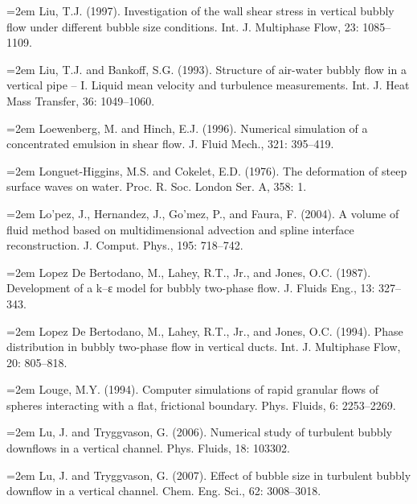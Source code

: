 \documentclass[11pt,a4paper,openany,fontset=none]{ctexbook}
\begin{document}
\par\hangindent=2em Liu, T.J. (1997). Investigation of the wall shear stress in vertical bubbly flow under different bubble size conditions. Int. J. Multiphase Flow, 23: 1085--1109.

\par\hangindent=2em Liu, T.J. and Bankoff, S.G. (1993). Structure of air-water bubbly flow in a vertical pipe -- I. Liquid mean velocity and turbulence measurements. Int. J. Heat Mass Transfer, 36: 1049--1060.

\par\hangindent=2em Loewenberg, M. and Hinch, E.J. (1996). Numerical simulation of a concentrated emulsion in shear flow. J. Fluid Mech., 321: 395--419.

\par\hangindent=2em Longuet-Higgins, M.S. and Cokelet, E.D. (1976). The deformation of steep surface waves on water. Proc. R. Soc. London Ser. A, 358: 1.

\par\hangindent=2em Lo'pez, J., Hernandez, J., Go'mez, P., and Faura, F. (2004). A volume of fluid method based on multidimensional advection and spline interface reconstruction. J. Comput. Phys., 195: 718--742.


\par\hangindent=2em Lopez De Bertodano, M., Lahey, R.T., Jr., and Jones, O.C. (1987). Development of a k--ε model for bubbly two-phase flow. J. Fluids Eng., 13: 327--343.

\par\hangindent=2em Lopez De Bertodano, M., Lahey, R.T., Jr., and Jones, O.C. (1994). Phase distribution in bubbly two-phase flow in vertical ducts. Int. J. Multiphase Flow, 20: 805--818.

\par\hangindent=2em Louge, M.Y. (1994). Computer simulations of rapid granular flows of spheres interacting with a flat, frictional boundary. Phys. Fluids, 6: 2253--2269.

\par\hangindent=2em Lu, J. and Tryggvason, G. (2006). Numerical study of turbulent bubbly downflows in a vertical channel. Phys. Fluids, 18: 103302.

\par\hangindent=2em Lu, J. and Tryggvason, G. (2007). Effect of bubble size in turbulent bubbly downflow in a vertical channel. Chem. Eng. Sci., 62: 3008--3018.
\end{document}
